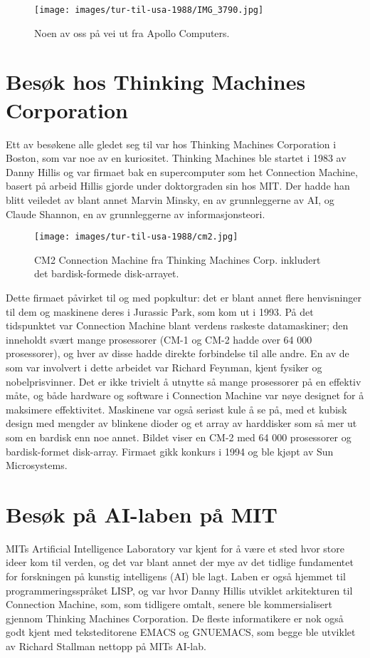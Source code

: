 \begin{figure}[h!]
	\centering
	\texttt{[image: images/tur-til-usa-1988/IMG\_3790.jpg]}
	\caption{Noen av oss på vei ut fra Apollo Computers.}
\end{figure}

\section{Besøk hos Thinking Machines Corporation}

Ett av besøkene alle gledet seg til var hos Thinking Machines Corporation i Boston, som var noe av en kuriositet. Thinking Machines ble startet i 1983 av Danny Hillis og var firmaet bak en supercomputer som het Connection Machine, basert på arbeid Hillis gjorde under doktorgraden sin hos MIT. Der hadde han blitt veiledet av blant annet Marvin Minsky, en av grunnleggerne av AI, og Claude Shannon, en av grunnleggerne av informasjonsteori. 

\begin{figure}
	\centering
	\texttt{[image: images/tur-til-usa-1988/cm2.jpg]}
	\caption{CM2 Connection Machine fra Thinking Machines Corp. inkludert det bardisk-formede disk-arrayet.}
\end{figure}

Dette firmaet påvirket til og med popkultur: det er blant annet flere henvisninger til dem og maskinene deres i Jurassic Park, som kom ut i 1993. På det tidspunktet var Connection Machine blant verdens raskeste datamaskiner; den inneholdt svært mange prosessorer (CM-1 og CM-2 hadde over 64 000 prosessorer), og hver av disse hadde direkte forbindelse til alle andre. En av de som var involvert i dette arbeidet var Richard Feynman, kjent fysiker og nobelprisvinner. Det er ikke trivielt å utnytte så mange prosessorer på en effektiv måte, og både hardware og software i Connection Machine var nøye designet for å maksimere effektivitet. Maskinene var også seriøst kule å se på, med et kubisk design med mengder av blinkene dioder og et array av harddisker som så mer ut som en bardisk enn noe annet. Bildet viser en CM-2 med 64 000 prosessorer og bardisk-formet disk-array. Firmaet gikk konkurs i 1994 og ble kjøpt av Sun Microsystems. 

\section{Besøk på AI-laben på MIT}

MITs Artificial Intelligence Laboratory var kjent for å være et sted hvor store ideer kom til verden, og det var blant annet der mye av det tidlige fundamentet for forskningen på kunstig intelligens (AI) ble lagt. Laben er også hjemmet til programmeringsspråket LISP, og var hvor Danny Hillis utviklet arkitekturen til Connection Machine, som, som tidligere omtalt, senere ble kommersialisert gjennom Thinking Machines Corporation. De fleste informatikere er nok også godt kjent med teksteditorene EMACS og GNUEMACS, som begge ble utviklet av Richard Stallman nettopp på MITs AI-lab. 


